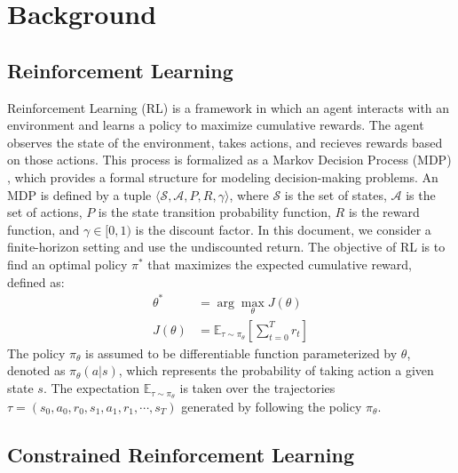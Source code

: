 \section{Background}

\subsection{Reinforcement Learning}

Reinforcement Learning (RL) is a framework in which an agent interacts with an environment and learns a policy to maximize cumulative rewards.
The agent observes the state of the environment, takes actions, and recieves rewards based on those actions.
This process is formalized as a Markov Decision Process (MDP) \cite{MDP}, which provides a formal structure for modeling decision-making problems.
An MDP is defined by a tuple $\langle \mathcal{S}, \mathcal{A}, P, R, \gamma \rangle$, where $\mathcal{S}$ is the set of states, $\mathcal{A}$ is the set of actions, $P$ is the state transition probability function, $R$ is the reward function, and $\gamma \in [0, 1)$ is the discount factor.
In this document, we consider a finite-horizon setting and use the undiscounted return.
The objective of RL is to find an optimal policy $\pi^*$ that maximizes the expected cumulative reward, defined as:
\begin{equation}
    \begin{aligned}
        \theta^* &= \arg\max_\theta J(\theta) \\
        J(\theta) &= \mathbb{E}_{\tau \sim \pi_\theta} \left[ \sum^T_{t = 0} r_t \right]
    \end{aligned}
\end{equation}
The policy $\pi_\theta$ is assumed to be differentiable function parameterized by $\theta$, denoted as $\pi_\theta(a|s)$, which represents the probability of taking action a given state $s$.
The expectation $\mathbb{E}_{\tau \sim \pi_\theta}$ is taken over the trajectories $\tau  = (s_0, a_0, r_0, s_1, a_1, r_1, \cdots, s_T)$ generated by following the policy $\pi_\theta$.

\subsection{Constrained Reinforcement Learning}

